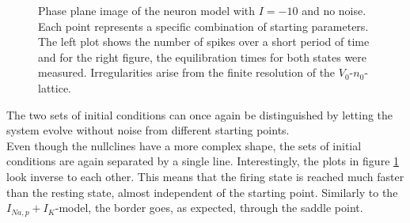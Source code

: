 \documentclass[12pt,a4paper]{article}
\begin{document}
\begin{figure}[H]
	\hspace*{-0.5cm}
	
	\caption{Phase plane image of the neuron model with $I=-10$ and no noise. Each point represents a specific combination of starting parameters. The left plot shows the number of spikes over a short period of time and for the right figure, the equilibration times for both states were measured. Irregularities arise from the finite resolution of the $V_0$-$n_0$-lattice.}
	\label{twodomrinzel}
\end{figure}
The two sets of initial conditions can once again be distinguished by letting the system evolve without noise from different starting points.\\
Even though the nullclines have a more complex shape, the sets of initial conditions are again separated by a single line.
Interestingly, the plots in figure \ref{twodomrinzel} look inverse to each other. This means that the firing state is reached much faster than the resting state, almost independent of the starting point. Similarly to the $I_{Na,p}+I_K$-model, the border goes, as expected, through the saddle point.
\end{document}
